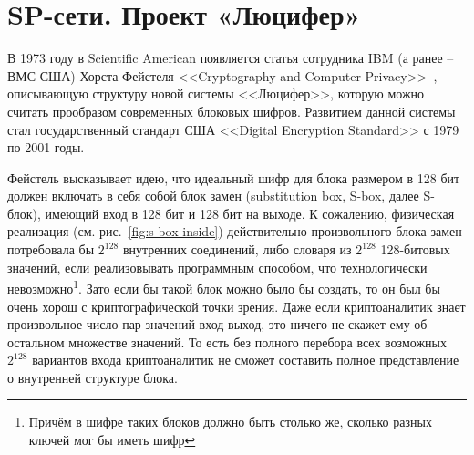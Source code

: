 \section{SP-сети. Проект «Люцифер»}\label{project-lucifer}

В 1973 году  в Scientific American появляется статья сотрудника IBM (а ранее -- ВМС США) Хорста Фейстеля <<Cryptography and Computer Privacy>>~\cite{Feistel:1973}, описывающую структуру новой системы <<Люцифер>>, которую можно считать прообразом современных блоковых шифров. Развитием данной системы стал государственный стандарт США <<Digital Encryption Standard>> с 1979 по 2001 годы.

Фейстель высказывает идею, что идеальный шифр для блока размером в 128 бит должен включать в себя собой блок замен (substitution box, S-box, далее S-блок), имеющий вход в 128 бит и 128 бит на выходе. К сожалению, физическая реализация (см. рис.~\ref{fig:s-box-inside}) действительно произвольного блока замен потребовала бы $2^{128}$ внутренних соединений, либо словаря из $2^{128}$ 128-битовых значений, если реализовывать программным способом, что технологически невозможно\footnote{Причём в шифре таких блоков должно быть столько же, сколько разных ключей мог бы иметь шифр}. Зато если бы такой блок можно было бы создать, то он был бы очень хорош с криптографической точки зрения. Даже если криптоаналитик знает произвольное число пар значений вход-выход, это ничего не скажет ему об остальном множестве значений. То есть без полного перебора всех возможных $2^{128}$ вариантов входа криптоаналитик не сможет составить полное представление о внутренней структуре блока.


